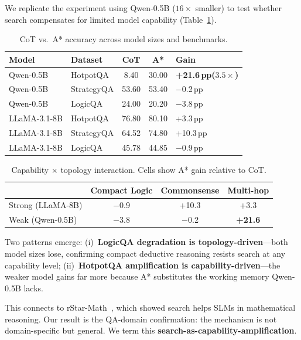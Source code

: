 \documentclass[11pt]{article}
\newcommand{\pp}{\,pp}
\begin{document}
We replicate the experiment using Qwen-0.5B ($16\times$ smaller) to test whether search compensates for limited model capability (Table~\ref{tab:slm}).

\begin{table}[t]
\centering
\caption{CoT vs.\ A* accuracy across model sizes and benchmarks.}
\label{tab:slm}
\small
\begin{tabular}{@{}llccl@{}}
\toprule
\textbf{Model} & \textbf{Dataset} & \textbf{CoT} & \textbf{A*} & \textbf{Gain} \\
\midrule
Qwen-0.5B & HotpotQA & 8.40 & 30.00 & \textbf{+21.6\pp ($3.5\times$)} \\
Qwen-0.5B & StrategyQA & 53.60 & 53.40 & $-$0.2\pp \\
Qwen-0.5B & LogicQA & 24.00 & 20.20 & $-$3.8\pp \\
\midrule
LLaMA-3.1-8B & HotpotQA & 76.80 & 80.10 & +3.3\pp \\
LLaMA-3.1-8B & StrategyQA & 64.52 & 74.80 & +10.3\pp \\
LLaMA-3.1-8B & LogicQA & 45.78 & 44.85 & $-$0.9\pp \\
\bottomrule
\end{tabular}
\end{table}

\begin{table}[t]
\centering
\caption{Capability $\times$ topology interaction. Cells show A* gain relative to CoT.}
\label{tab:interaction}
\small
\begin{tabular}{@{}lccc@{}}
\toprule
& \textbf{Compact Logic} & \textbf{Commonsense} & \textbf{Multi-hop} \\
\midrule
Strong (LLaMA-8B) & $-$0.9 & +10.3 & +3.3 \\
Weak (Qwen-0.5B) & $-$3.8 & $-$0.2 & \textbf{+21.6} \\
\bottomrule
\end{tabular}
\end{table}

Two patterns emerge: (i)~\textbf{LogicQA degradation is topology-driven}---both model sizes lose, confirming compact deductive reasoning resists search at any capability level; (ii)~\textbf{HotpotQA amplification is capability-driven}---the weaker model gains far more because A* substitutes the working memory Qwen-0.5B lacks.

This connects to rStar-Math~\citep{guan2025rstar}, which showed search helps SLMs in mathematical reasoning. Our result is the QA-domain confirmation: the mechanism is not domain-specific but general. We term this \textbf{search-as-capability-amplification}.
\end{document}
